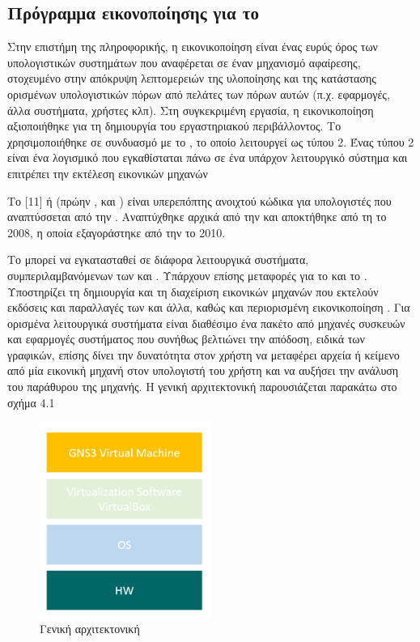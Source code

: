 \subsection{Πρόγραμμα εικονοποίησης για το }

Στην επιστήμη της πληροφορικής, η εικονικοποίηση  είναι ένας ευρύς όρος 
των υπολογιστικών συστημάτων που αναφέρεται σε έναν μηχανισμό αφαίρεσης, 
στοχευμένο στην απόκρυψη λεπτομερειών της υλοποίησης και της κατάστασης
ορισμένων υπολογιστικών πόρων από πελάτες των πόρων αυτών 
(π.χ. εφαρμογές, άλλα συστήματα, χρήστες κλπ). 
Στη συγκεκριμένη εργασία, η εικονικοποίηση αξιοποιήθηκε για τη δημιουργία του εργαστηριακού περιβάλλοντος. Το  χρησιμοποιήθηκε σε συνδυασμό με το , το οποίο λειτουργεί ως  τύπου 2. Ένας  τύπου 2 είναι ένα λογισμικό που εγκαθίσταται πάνω σε ένα υπάρχον λειτουργικό σύστημα και επιτρέπει την εκτέλεση εικονικών μηχανών

Το [11] ή  (πρώην ,  και ) είναι υπερεπόπτης
ανοιχτού κώδικα για υπολογιστές  που αναπτύσσεται από την .
Αναπτύχθηκε αρχικά από την 
και αποκτήθηκε από τη  το 2008, η οποία εξαγοράστηκε από την  το 2010.

Το  μπορεί να εγκατασταθεί σε διάφορα λειτουργικά συστήματα, συμπεριλαμβανόμενων των  και .
Υπάρχουν επίσης μεταφορές για το  και το .
Υποστηρίζει τη δημιουργία και τη διαχείριση εικονικών μηχανών που εκτελούν εκδόσεις και παραλλαγές των 
και άλλα, καθώς και περιορισμένη εικονικοποίηση .
Για ορισμένα λειτουργικά συστήματα είναι διαθέσιμο ένα πακέτο  από μηχανές συσκευών και εφαρμογές συστήματος
που συνήθως βελτιώνει την απόδοση, ειδικά των γραφικών, επίσης δίνει την δυνατότητα στον χρήστη να μεταφέρει αρχεία ή κείμενο από μία εικονική μηχανή στον υπολογιστή του χρήστη και να αυξήσει την ανάλυση του παράθυρου της μηχανής. 
Η γενική αρχιτεκτονική παρουσιάζεται παρακάτω στο σχήμα 4.1

\begin{figure}[htb]
	\centering
	\includegraphics[width=0.5\textwidth]{graphics/Architecture_virtualbox.PNG}
	\caption{ Γενική αρχιτεκτονική}
\end{figure}

